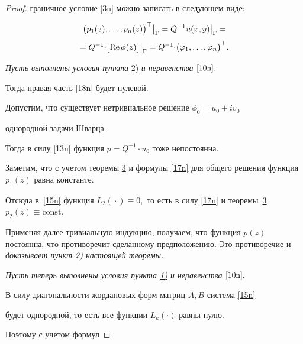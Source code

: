 \begin{proof}
граничное условие \eqref{3n} можно записать в следующем виде:

 \begin{multline}

\bigr(p_1(z),\ldots,p_n(z)\bigr)^\top\bigr|_\Gamma=

Q^{-1}u(x,y)\bigr|_\Gamma=\\

=Q^{-1}\cdot\bigr[\mbox{Re}\,\phi(z)\bigr]\bigr|_\Gamma=

Q^{-1} \cdot\bigr(\varphi_1,\ldots,\varphi_n\bigr)^\top.

\rule{0pt}{5mm}

\label{18n}

\end{multline}





{\it Пусть  выполнены условия пункта} \hyperlink{nik:th4-2}{2)} {\it  и неравенства $\eqref{10n}.$ }

Тогда правая часть \eqref{18n} будет нулевой.



Допустим, что существует нетривиальное решение $\phi_0=u_0+iv_0$

однородной задачи Шварца.

Тогда в силу \eqref{13n} функция $p=Q^{-1}\cdot u_0$ тоже непостоянна.

Заметим, что с учетом теоремы \hyperlink{nik:th3}{3} и формулы \eqref{17n} для общего решения функция $p_1(z)$ равна константе. 

Отсюда в~\eqref{15n} функция $L_2({}\cdot{})\equiv 0,$ то есть в силу \eqref{17n} и теоремы~\hyperlink{nik:th3}{3}  $p_2(z)\equiv\mbox{const}.$

Применяя далее тривиальную индукцию, получаем, что функция $p(z)$ постоянна, что противоречит сделанному предположению. Это противоречие и {\it доказывает пункт {\rm \hyperlink{nik:th4-2}{2)}} настоящей теоремы. }



\smallskip



 {\it Пусть теперь  выполнены условия пункта {\rm \hyperlink{nik:th4-1}{1)}} и неравенства $\eqref{10n}.$ }

В силу диагональности жордановых форм матриц $A,B$ система \eqref{15n}

будет однородной, то есть все функции $L_k(\cdot)$  равны  нулю.

Поэтому с  учетом формул


\end{proof}
